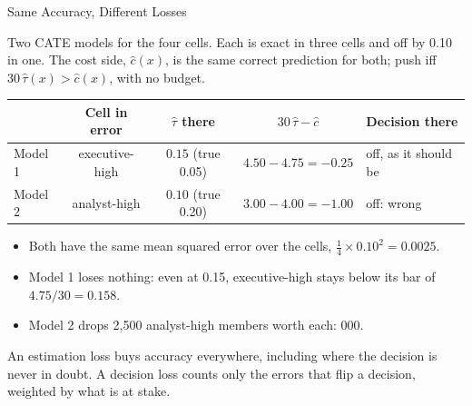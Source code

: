 \documentclass[aspectratio=169, 11pt, handout]{beamer}
\newcommand{\hatt}{\hat{\tau}}
\begin{document}
\begin{frame}{Same Accuracy, Different Losses}

Two CATE models for the four cells. Each is exact in three cells and off by 0.10 in one. The cost side, $\hat c(x)$, is the same correct prediction for both; push iff $30\,\hatt(x) > \hat c(x)$, with no budget.

\begin{center}
\small
\begin{tabular}{lcccl}
\toprule
& \textbf{Cell in error} & $\hatt$ \textbf{there} & $30\,\hatt - \hat c$ & \textbf{Decision there} \\
\midrule
Model 1 & executive-high & $0.15$ (true 0.05) & $4.50 - 4.75 = -0.25$ & off, as it should be \\
Model 2 & analyst-high & $0.10$ (true 0.20) & $3.00 - 4.00 = -1.00$ & \textcolor{warnred}{off: wrong} \\
\bottomrule
\end{tabular}
\end{center}

\medskip

\begin{itemize}
  \item Both have the same mean squared error over the cells, $\tfrac14 \times 0.10^2 = 0.0025$.
  \item Model 1 loses nothing: even at 0.15, executive-high stays below its bar of $4.75/30 = 0.158$.
  \item Model 2 drops 2{,}500 analyst-high members worth  each: 000.
\end{itemize}

\medskip

An estimation loss buys accuracy everywhere, including where the decision is never in doubt. A decision loss counts only the errors that flip a decision, weighted by what is at stake.
\end{frame}
\end{document}
